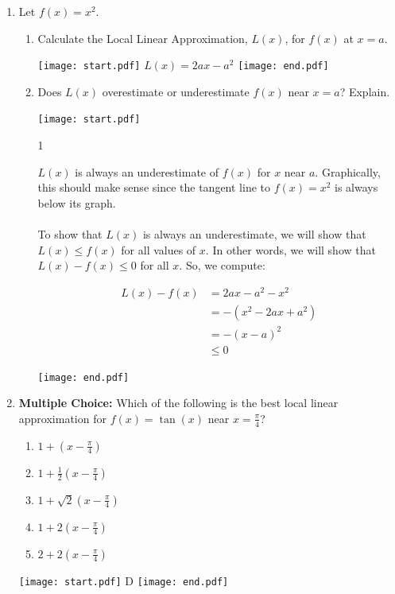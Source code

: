 \documentclass[12pt]{article}
\begin{document}
\begin{enumerate}
\begin{enumerate}
\end{enumerate}

\item Let $f(x)=x^2$.

\begin{enumerate}

\item Calculate the Local Linear Approximation, $L(x)$, for $f(x)$ at $x=a$.

\texttt{[image: start.pdf]}
{{$L(x)=2ax-a^2$}}
\texttt{[image: end.pdf]}


\item Does $L(x)$ overestimate or underestimate $f(x)$ near $x=a$?  Explain.

\texttt{[image: start.pdf]}
{{{1\linewidth}{$L(x)$ is always an underestimate of $f(x)$ for $x$ near $a$.  Graphically, this should make sense since the tangent line to $f(x)=x^2$ is always below its graph.\\
\\
To show that $L(x)$ is always an underestimate, we will show that $L(x)\leq f(x)$ for all values of $x$.  In other words, we will show that $L(x)-f(x) \leq0$ for all $x$.  So, we compute:

\begin{align*}
L(x)-f(x) &= 2ax-a^2-x^2\\
&=-(x^2-2ax+a^2)\\
&=-(x-a)^2\\
& \leq0
\end{align*}
}}}
\texttt{[image: end.pdf]}


\end{enumerate}

\item {\bf Multiple Choice:} Which of the following is the best local linear approximation for $f(x)=\tan(x)$ near $\displaystyle x=\frac{\pi}{4}$?

\begin{enumerate}

\item  $\displaystyle 1+\left(x-\frac{\pi}{4}\right)$

\item $\displaystyle 1+ \frac{1}{2}\left(x-\frac{\pi}{4}\right)$

\item  $\displaystyle 1+\sqrt{2}\left(x-\frac{\pi}{4}\right)$

\item  $\displaystyle 1+2\left(x-\frac{\pi}{4}\right)$

\item $\displaystyle 2+2\left(x-\frac{\pi}{4}\right)$

\end{enumerate}

\texttt{[image: start.pdf]}
{{D}}
\texttt{[image: end.pdf]}


\end{enumerate}
\end{document}
